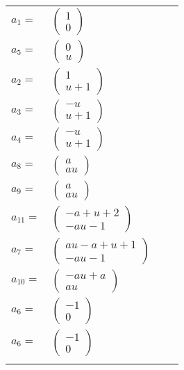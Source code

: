 \documentclass[1p]{elsarticle_modified}
\theoremstyle{definition}
\begin{document}
\begin{tabular}{m{7pt} m{180pt} m{7pt} m{180pt} }
\flushright $a_{1}=$&$\begin{pmatrix}1\\0\end{pmatrix}$ \\
\flushright $a_{5}=$&$\begin{pmatrix}0\\u\end{pmatrix}$ \\
\flushright $a_{2}=$&$\begin{pmatrix}1\\u+1\end{pmatrix}$ \\
\flushright $a_{3}=$&$\begin{pmatrix}- u\\u+1\end{pmatrix}$ \\
\flushright $a_{4}=$&$\begin{pmatrix}- u\\u+1\end{pmatrix}$ \\
\flushright $a_{8}=$&$\begin{pmatrix}a\\a u\end{pmatrix}$ \\
\flushright $a_{9}=$&$\begin{pmatrix}a\\a u\end{pmatrix}$ \\
\flushright $a_{11}=$&$\begin{pmatrix}- a+u+2\\- a u-1\end{pmatrix}$ \\
\flushright $a_{7}=$&$\begin{pmatrix}a u- a+u+1\\- a u-1\end{pmatrix}$ \\
\flushright $a_{10}=$&$\begin{pmatrix}- a u+a\\a u\end{pmatrix}$ \\
\flushright $a_{6}=$&$\begin{pmatrix}-1\\0\end{pmatrix}$\\ \flushright $a_{6}=$&$\begin{pmatrix}-1\\0\end{pmatrix}$\\&\end{tabular}
\end{document}
